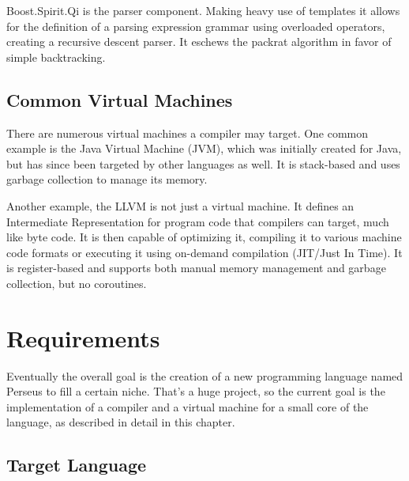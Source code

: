 		Boost.Spirit.Qi is the parser component. Making heavy use of templates it allows for the definition of a parsing expression grammar using overloaded operators, creating a recursive descent parser. It eschews the packrat algorithm in favor of simple backtracking.

	\section{Common Virtual Machines}
		
		There are numerous virtual machines a compiler may target. One common example is the Java Virtual Machine (JVM), which was initially created for Java, but has since been targeted by other languages as well. It is stack-based and uses garbage collection to manage its memory.
		
		Another example, the LLVM is not just a virtual machine. It defines an Intermediate Representation for program code that compilers can target, much like byte code. It is then capable of optimizing it, compiling it to various machine code formats or executing it using on-demand compilation (JIT/Just In Time). It is register-based and supports both manual memory management and garbage collection, but no coroutines.

\chapter{Requirements}\label{requirements}

	
	Eventually the overall goal is the creation of a new programming language named Perseus to fill a certain niche. That's a huge project, so the current goal is the implementation of a compiler and a virtual machine for a small core of the language, as described in detail in this chapter.

    \section{Target Language}
    
